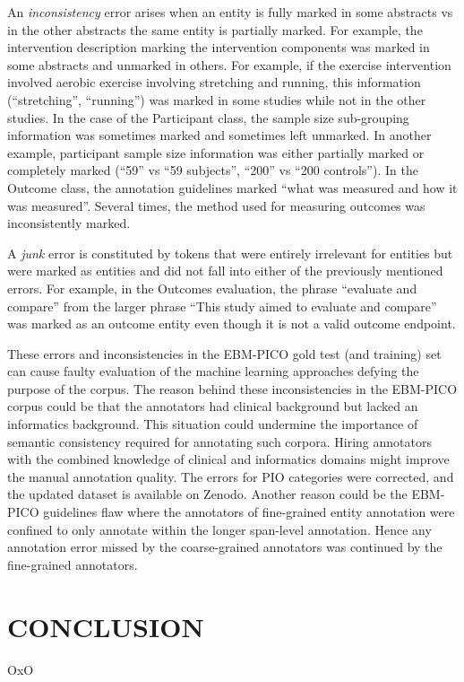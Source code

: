 \documentclass[10.7pt,]{article}
\begin{document}
An \textit{inconsistency} error arises when an entity is fully marked in some abstracts vs in the other abstracts the same entity is partially marked. 
For example, the intervention description marking the intervention components was marked in some abstracts and unmarked in others.
For example, if the exercise intervention involved aerobic exercise involving stretching and running, this information (``stretching'', ``running'') was marked in some studies while not in the other studies.
In the case of the Participant class, the sample size sub-grouping information was sometimes marked and sometimes left unmarked.
In another example, participant sample size information was either partially marked or completely marked (``59'' vs ``59 subjects'', ``200'' vs ``200 controls'').
In the Outcome class, the annotation guidelines marked ``what was measured and how it was measured''. 
Several times, the method used for measuring outcomes was inconsistently marked.

A \textit{junk} error is constituted by tokens that were entirely irrelevant for entities but were marked as entities and did not fall into either of the previously mentioned errors.
For example, in the Outcomes evaluation, the phrase ``evaluate and compare'' from the larger phrase ``This study aimed to evaluate and compare'' was marked as an outcome entity even though it is not a valid outcome endpoint.


These errors and inconsistencies in the EBM-PICO gold test (and training) set can cause faulty evaluation of the machine learning approaches defying the purpose of the corpus.
The reason behind these inconsistencies in the EBM-PICO corpus could be that the annotators had clinical background but lacked an informatics background.
This situation could undermine the importance of semantic consistency required for annotating such corpora.
Hiring annotators with the combined knowledge of clinical and informatics domains might improve the manual annotation quality.
The errors for PIO categories were corrected, and the updated dataset is available on Zenodo.
Another reason could be the EBM-PICO guidelines flaw where the annotators of fine-grained entity annotation were confined to only annotate within the longer span-level annotation.
Hence any annotation error missed by the coarse-grained annotators was continued by the fine-grained annotators.
%
%
%
\section{CONCLUSION}\label{conclusion}
%
OxO
%
%
%
\end{document}
